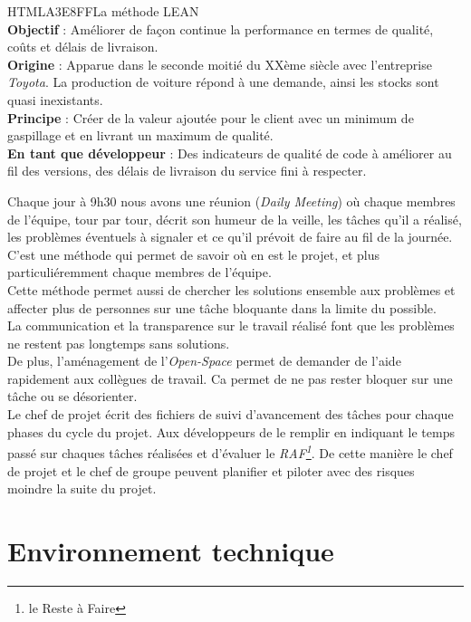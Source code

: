  \begin{colbox}{{HTML}{A3E8FF}}{La méthode LEAN\\ }
   \textbf{Objectif} : Améliorer de façon continue la performance en termes de qualité, coûts et délais de livraison.
   \\\textbf{Origine} : Apparue dans le seconde moitié du XXème siècle avec l'entreprise \textit{Toyota}. La production de voiture répond à une demande, ainsi les stocks sont quasi inexistants.
   \\\textbf{Principe} : Créer de la valeur ajoutée pour le client avec un minimum de gaspillage et en livrant un maximum de qualité.
   \\\textbf{En tant que développeur} : Des indicateurs de qualité de code à améliorer au fil des versions, des délais de livraison du service fini à respecter.
 \end{colbox}

 Chaque jour à 9h30 nous avons une réunion (\textit{Daily Meeting}) où chaque membres de l'équipe, tour par tour, décrit son humeur de la veille, les tâches qu'il a réalisé, les problèmes éventuels à signaler et ce qu'il prévoit de faire au fil de la journée.
 \\ C'est une méthode qui permet de savoir où en est le projet, et plus particuliéremment chaque membres de l'équipe. \\Cette méthode permet aussi de chercher les solutions ensemble aux problèmes et affecter plus de personnes sur une tâche bloquante dans la limite du possible.
\\La communication et la transparence sur le travail réalisé font que les problèmes ne restent pas longtemps sans solutions.
\\De plus, l'aménagement de l'\textit{Open-Space} permet de demander de l'aide rapidement aux collègues de travail. Ca permet de ne pas rester bloquer sur une tâche ou se désorienter.
\\Le chef de projet écrit des fichiers de suivi d'avancement des tâches pour chaque phases du cycle du projet. Aux développeurs de le remplir en indiquant le temps passé sur chaques tâches réalisées et d'évaluer le \textit{RAF\footnote{le Reste à Faire}}. De cette manière le chef de projet et le chef de groupe peuvent planifier et piloter avec des risques moindre la suite du projet.

\chapter{Environnement technique}
